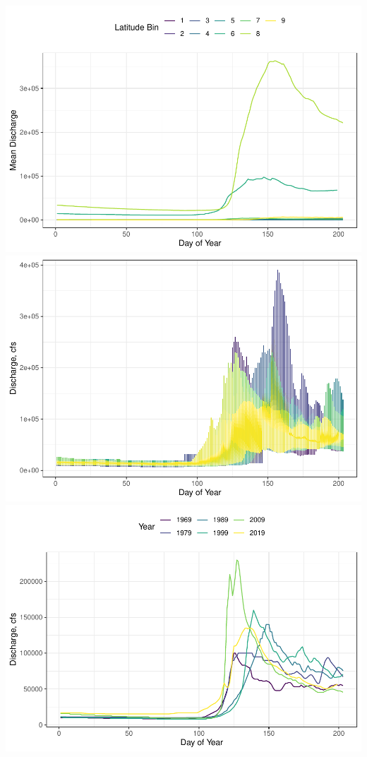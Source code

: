 \documentclass[12pt,]{article}
\begin{document}
\includegraphics{Project_Report_v2_files/figure-latex/Snowmelt Day of Year Exploratory Graphs and Code-1.pdf}
\includegraphics{Project_Report_v2_files/figure-latex/Snowmelt Day of Year Exploratory Graphs and Code-2.pdf}
\includegraphics{Project_Report_v2_files/figure-latex/Snowmelt Day of Year Exploratory Graphs and Code-3.pdf}
\end{document}
